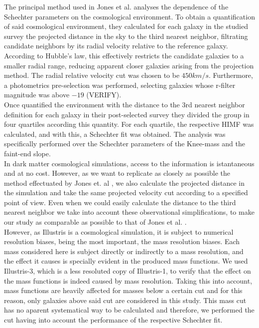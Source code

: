 \documentclass[a4paper,fleqn,usenatbib]{mnras}
\begin{document}
The principal method used in Jones et al. \cite{jones1} analyses the
dependence of the Schechter parameters on the cosmological
environment. To obtain a quantification of said cosmological
environment, they calculated for each galaxy in the studied survey the
projected distance in the sky to the third nearest neighbor,
filtrating candidate neighbors by its radial velocity relative to the
reference galaxy. According to Hubble's law, this effectively
restricts the candidate galaxies to a smaller radial range, reducing
apparent closer galaxies arising from the projection method. The
radial relative velocity cut was chosen to be $450km/s$. Furthermore,
a photometrics pre-selection was performed, selecting galaxies whose
r-filter magnitude was above $-19$ (VERIFY).\\  

Once quantified the environment with the distance to the 3rd nearest
neighbor definition for each galaxy in their post-selected survey they
divided the group in four quartiles according this quantity. For each
quartile, the respective HIMF was calculated, and with this, a
Schechter fit was obtained. The analysis was specifically performed
over the Schechter parameters of the Knee-mass and the faint-end
slope. \\ 
 
In dark matter cosmological simulations, access to the information is
istantaneous and at no cost. However, as we want to replicate as
closely as possible the method effectuated by Jones et. al
\cite{jones1}, we also calculate the projected distance in the
simulation and take the same projected velocity cut according to a
specified point of view. Even when we could easily calculate the
distance to the third nearest neighbor we take into account these
observational simplifications, to make our study as comparable as
possible to that of Jones et al. \cite{jones1}.\\ 

However, as Illustris is a cosmological simulation, it is subject to numerical resolution biases, being the most important, the mass resolution biases. Each mass considered here is subject directly or indirectly to a mass resolution, and the effect it causes is specially evident in the produced mass functions. We used Illustris-3, which is a less resoluted copy of Illustris-1, to verify that the effect on the mass functions is indeed caused by mass resolution. Taking this into account, mass functions are heavily affected for masses below a certain cut and for this reason, only galaxies above said cut are considered in this study. This mass cut has no aparent systematical way to be calculated and therefore, we performed the cut having into account the performance of the respective Schechter fit.\\
\end{document}
